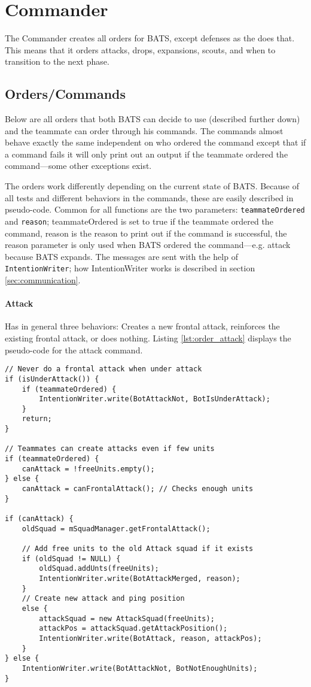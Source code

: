 \section{Commander}
\label{sec:Commander}
The Commander creates all orders for BATS, except defenses as the  does
that. This means that it orders attacks, drops, expansions, scouts, and when to transition to the
next phase.

\subsection{Orders/Commands}
Below are all orders that both BATS can decide to use (described further down) and the teammate can
order through his commands. The commands almost behave exactly the same independent on who ordered
the command except that if a command fails it will only print out an output if the teammate ordered the
command—some other exceptions exist.

The orders work differently depending on the current state of BATS. Because of all tests and
different behaviors in the commands, these are easily described in pseudo-code. Common for all
functions are the two parameters: \texttt{teammateOrdered}
and \texttt{reason}; teammateOrdered is set to true if the teammate ordered the command, reason is
the reason to print out if the command is successful, the reason parameter is only used when BATS ordered the
command—e.g. attack because BATS expands. The messages are sent with the help of
\texttt{IntentionWriter}; how IntentionWriter works is described in section \ref{sec:communication}.

\paragraph{Attack}
Has in general three behaviors: Creates a new frontal attack, reinforces the existing frontal
attack, or does nothing. Listing \ref{lst:order_attack} displays the pseudo-code for the attack
command.
\begin{lstlisting}[label={lst:order_attack},caption={Pseudo-code for the attack command}]
// Never do a frontal attack when under attack
if (isUnderAttack()) {
	if (teammateOrdered) {
		IntentionWriter.write(BotAttackNot, BotIsUnderAttack);
	}
	return;
}

// Teammates can create attacks even if few units
if (teammateOrdered) {
	canAttack = !freeUnits.empty();
} else {
	canAttack = canFrontalAttack(); // Checks enough units
}

if (canAttack) {
	oldSquad = mSquadManager.getFrontalAttack();
	
	// Add free units to the old Attack squad if it exists
	if (oldSquad != NULL) {
		oldSquad.addUnts(freeUnits);
		IntentionWriter.write(BotAttackMerged, reason);
	}
	// Create new attack and ping position
	else {
		attackSquad = new AttackSquad(freeUnits);
		attackPos = attackSquad.getAttackPosition();
		IntentionWriter.write(BotAttack, reason, attackPos);
	}
} else {
	IntentionWriter.write(BotAttackNot, BotNotEnoughUnits);
}
\end{lstlisting}

